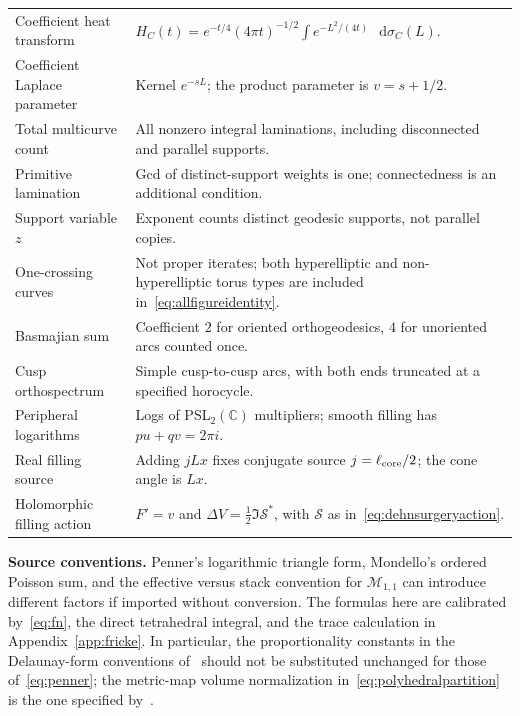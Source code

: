 \documentclass[11pt,a4paper]{article}
\numberwithin{equation}{section}
\theoremstyle{definition}
\theoremstyle{remark}
\newcommand{\dd}{\mathop{}\!\mathrm d}
\newcommand{\M}{\mathcal M}
\newcommand{\CC}{\mathbb C}
\begin{document}
\begin{longtable}{@{}>{\raggedright\arraybackslash}p{}
 >{\raggedright\arraybackslash}p{}@{}}
Coefficient heat transform & $H_C(t)=e^{-t/4}(4\pi t)^{-1/2}\int e^{-L^2/(4t)}\,\dd\sigma_C(L)$.\\
Coefficient Laplace parameter & Kernel $e^{-sL}$; the product parameter is $v=s+1/2$.\\
Total multicurve count & All nonzero integral laminations, including disconnected and parallel supports.\\
Primitive lamination & Gcd of distinct-support weights is one; connectedness is an additional condition.\\
Support variable $z$ & Exponent counts distinct geodesic supports, not parallel copies.\\
One-crossing curves & Not proper iterates; both hyperelliptic and non-hyperelliptic torus types are included in~\eqref{eq:allfigureidentity}.\\
Basmajian sum & Coefficient $2$ for oriented orthogeodesics, $4$ for unoriented arcs counted once.\\
Cusp orthospectrum & Simple cusp-to-cusp arcs, with both ends truncated at a specified horocycle.\\
Peripheral logarithms & Logs of PSL$_2(\CC)$ multipliers; smooth filling has $pu+qv=2\pi i$.\\
Real filling source & Adding $jLx$ fixes conjugate source $j=\ell_{\rm core}/2$; the cone angle is $Lx$.\\
Holomorphic filling action & $F'=v$ and $\Delta V=\frac12\Im\mathcal S^*$, with $\mathcal S$ as in~\eqref{eq:dehnsurgeryaction}.\\
\bottomrule
\end{longtable}
\endgroup

\noindent\textbf{Source conventions.}
Penner's logarithmic triangle form, Mondello's ordered Poisson sum, and
the effective versus stack convention for $\M_{1,1}$ can introduce different
factors if imported without conversion. The formulas here are calibrated
by~\eqref{eq:fn}, the direct tetrahedral integral, and the trace calculation
in Appendix~\ref{app:fricke}. In particular, the proportionality constants
in the Delaunay-form conventions of~\cite{CDE} should not be substituted
unchanged for those of~\eqref{eq:penner}; the metric-map volume normalization
in~\eqref{eq:polyhedralpartition} is the one specified by~\cite{Budd}.
\end{document}
